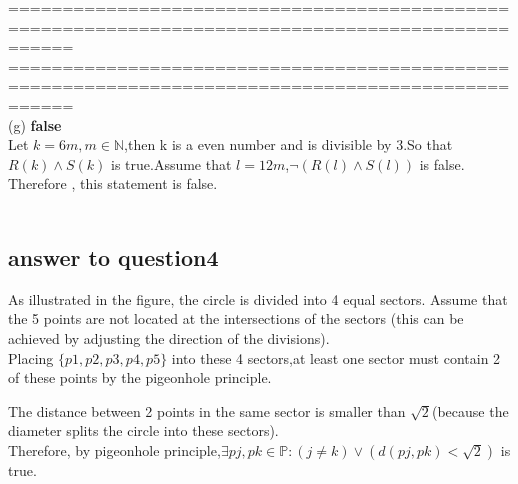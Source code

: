 \documentclass[12pt,a4paper]{article}
\begin{document}
==================================================================================================
\newpage
==================================================================================================
\\
(g) \textbf{false}\\
Let $k = 6m,m \in \mathbb{N}$,then k is a even number and is divisible by 3.So that $R(k) \land S(k)$ is true.Assume that $l = 12m$,$\neg (R(l) \land S(l))$ is false.\\
Therefore , this statement is false.\\\\

\subsection*{answer to question4}

\begin{center}
\end{center}

As illustrated in the figure, the circle is divided into 4 equal sectors. Assume that the 5 points are not located at the intersections of the sectors (this can be achieved by adjusting the direction of the divisions).\\Placing $ \{p1,p2,p3,p4,p5\}$ into these 4 sectors,at least one sector must contain 2 of these points by the pigeonhole principle.

The distance between 2 points in the same sector is smaller than $\sqrt2$(because the diameter splits the circle into these sectors).\\
Therefore, by pigeonhole principle,$\exists pj,pk \in \mathbb{P} : (j \neq k) \lor (d(pj,pk) < \sqrt2 )$ is true.
\end{document}

